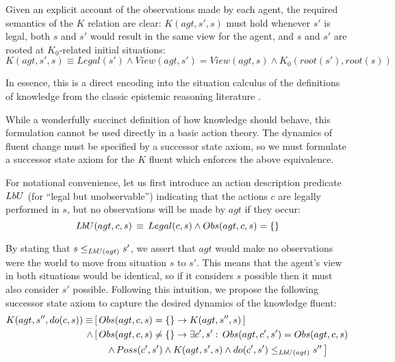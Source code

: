 Given an explicit account of the observations made by each agent,
the required semantics of the $K$ relation are clear: $K(agt,s',s)$
must hold whenever $s'$ is legal, both $s$ and $s'$ would result
in the same view for the agent, and $s$ and $s'$ are rooted at $K_{0}$-related
initial situations:\begin{equation}
K(agt,s',s)\equiv Legal(s')\wedge View(agt,s')=View(agt,s)\wedge K_{0}(root(s'),root(s))\label{eq:k-desired}\end{equation}


In essence, this is a direct encoding into the situation calculus
of the definitions of knowledge from the classic epistemic reasoning
literature \citep{parikh85dist_knowledge,halpern90knowledge_distrib,fagin95}.

While a wonderfully succinct definition of how knowledge should behave,
this formulation cannot be used directly in a basic action theory.
The dynamics of fluent change must be specified by a successor state
axiom, so we must formulate a successor state axiom for the $K$ fluent
which enforces the above equivalence.

For notational convenience, let us first introduce an action description
predicate $LbU$ (for {}``legal but unobservable'') indicating
that the actions $c$ are legally performed in $s$, but no observations
will be made by $agt$ if they occur:\begin{equation}
LbU(agt,c,s)\,\equiv\, Legal(c,s)\wedge Obs(agt,c,s)=\{\}\label{eqn:PbU_defn}\end{equation}


By stating that $s\leq_{LbU(agt)}s'$, we assert that $agt$ would
make no observations were the world to move from situation $s$ to
$s'$. This means that the agent's view in both situations would be
identical, so if it considers $s$ possible then it must also consider
$s'$ possible. Following this intuition, we propose the following
successor state axiom to capture the desired dynamics of the knowledge
fluent:\begin{align}
K(agt,s'',do(c,s))\equiv & \left[\, Obs(agt,c,s)=\{\}\rightarrow K(agt,s'',s)\,\right]\nonumber \\
\wedge & \left[\, Obs(agt,c,s)\neq\{\}\rightarrow\exists c',s':\, Obs(agt,c',s')=Obs(agt,c,s)\right.\nonumber \\
 & \left.\,\,\,\,\,\,\,\,\wedge\, Poss(c',s')\wedge K(agt,s',s)\wedge do(c',s')\leq_{LbU(agt)}s''\,\right]\label{eqn:new_k_ssa}\end{align}


